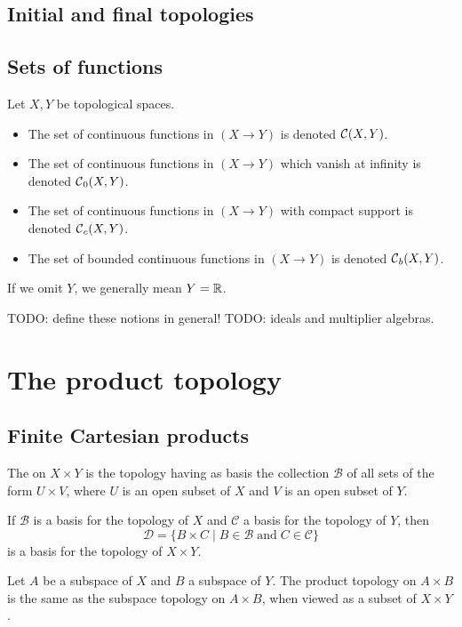 \subsection{Initial and final topologies}

\subsection{Sets of functions}
\begin{definition}
Let $X, Y$ be topological spaces.
\begin{itemize}
\item The set of continuous functions in $(X\to Y)$ is denoted $\operatorname{\mathcal{C}}(X, Y)$.
\item The set of continuous functions in $(X\to Y)$ which vanish at infinity is denoted $\operatorname{\mathcal{C}}_0(X, Y)$.
\item The set of continuous functions in $(X\to Y)$ with compact support is denoted $\operatorname{\mathcal{C}}_c(X, Y)$.
\item The set of bounded continuous functions in $(X\to Y)$ is denoted $\operatorname{\mathcal{C}}_b(X, Y)$.
\end{itemize}
If we omit $Y$, we generally mean $Y = \mathbb{R}$.
\end{definition}

TODO: define these notions in general!
TODO: ideals and multiplier algebras.


\section{The product topology}
\subsection{Finite Cartesian products}
\begin{definition}
The  on $X\times Y$ is the topology having as basis the collection $\mathcal{B}$ of all sets of the form $U\times V$, where $U$ is an open subset of $X$ and $V$ is an open subset of $Y$.
\end{definition}
\begin{lemma} \label{basisFiniteProductTopology}
If $\mathcal{B}$ is a basis for the topology of $X$ and $\mathcal{C}$ a basis for the topology of $Y$, then
\[ \mathcal{D} = \{ B\times C\;|\; B\in \mathcal{B}\;\text{and}\; C\in \mathcal{C} \} \]
is a basis for the topology of $X\times Y$.
\end{lemma}
\begin{proposition}
Let $A$ be a subspace of $X$ and $B$ a subspace of $Y$. The product topology on $A\times B$ is the same as the subspace topology on $A\times B$, when viewed as a subset of $X\times Y$.
\end{proposition}


